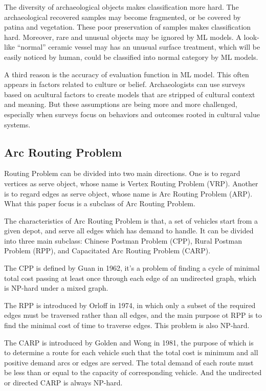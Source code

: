 \documentclass[journal]{IEEEtran}
\begin{document}
	The diversity of archaeological  objects makes classification more hard. The archaeological recovered samples may become fragmented, or be covered by patina and vegetation. These poor preservation of samples makes classification hard. Moreover, rare and unusual objects may be ignored by ML models. A look-like ``normal'' ceramic vessel may has an unusual surface treatment, which will be easily noticed by human, could be classified into normal category by ML models.\cite{bickler_2021}
	
	A third reason is the accuracy of evaluation function in ML model. This often appears in factors related to culture or belief. Archaeologists can use surveys based on acultural factors to create models that are stripped of cultural context and meaning. But these assumptions are being more and more challenged, especially when surveys focus on behaviors and outcomes rooted in cultural value systems.\cite{2019_challenge}\cite{2020_challenge}
	
	
	\subsection{Arc Routing Problem}
	Routing Problem can be divided into two main directions. One is to regard vertices as serve object, whose name is Vertex Routing Problem (VRP). Another is to regard edges as serve object, whose name is Arc Routing Problem (ARP). What this paper focus is a subclass of Arc Routing Problem.
	
	The characteristics of Arc Routing Problem is that, a set of vehicles start from a given depot, and serve all edges which has demand to handle. It can be divided into three main subclass: Chinese Postman Problem (CPP), Rural Postman Problem (RPP), and Capacitated Arc Routing Problem (CARP). \cite{inproceedings}
	
	The CPP is defined by Guan in 1962\cite{1962Graphic}, it's a problem of finding a cycle of minimal total cost passing at least once through each edge of an undirected graph, which is NP-hard under a mixed graph. 
	
	The RPP is introduced by Orloff in 1974\cite{RPP}, in which only a subset of the required edges must be traversed rather than all edges, and the main purpose ot RPP is to find the minimal cost of time to traverse edges. This problem is also NP-hard.
	
	The CARP is introduced by Golden and Wong in 1981\cite{CARP}, the purpose of which is to determine a route for each vehicle such that the total cost is minimum and all positive demand arcs or edges are served. The total demand of each route must be less than or equal to the capacity of corresponding vehicle. And the undirected or directed CARP is always NP-hard.
	
\end{document}
